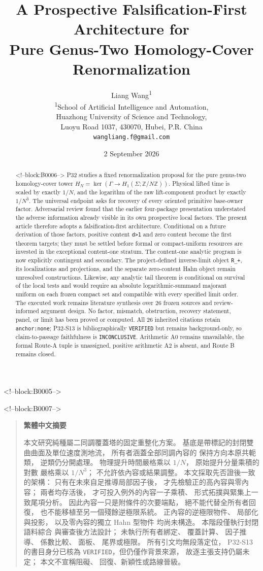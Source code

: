 \documentclass[11pt]{article}
\title{A Prospective Falsification-First Architecture for\\
Pure Genus-Two Homology-Cover Renormalization}
\author{Liang Wang\textsuperscript{1}\\
\small \textsuperscript{1}School of Artificial Intelligence and Automation,\\
\small Huazhong University of Science and Technology,\\
\small Luoyu Road 1037, 430070, Hubei, P.R. China\\
\small \texttt{wangliang.f@gmail.com}}
\date{2 September 2026}
\newenvironment{zhabstract}
  {\begin{quotation}\cjkfont\small\raggedright\noindent\textbf{繁體中文摘要}\par\smallskip\mdseries}
  {\end{quotation}}
\begin{document}
\maketitle

<!--block:B0005-->
\begin{abstract}

<!--block:B0006-->
P32 studies a fixed renormalization proposal for the pure genus-two
homology-cover tower
$H_N=\ker(\Gamma\to H_1(\Sigma;\mathbb Z/N\mathbb Z))$. Physical
lifted time is scaled by exactly $1/N$, and the logarithm of the
raw lift-component product by exactly $1/N^3$. The universal
endpoint asks for recovery of every oriented primitive base-owner
factor. Adversarial review found that the earlier four-package presentation
understated the adverse information already visible in its own
prospective local factors. The present article therefore adopts a
falsification-first architecture. Conditional on a future derivation of
those factors, positive content \texttt{d\textgreater{}1} and zero
content become the first theorem targets; they must be settled before
formal or compact-uniform resources are invested in the exceptional
content-one stratum. The content-one analytic program is now explicitly
contingent and secondary. The project-defined inverse-limit object
\texttt{R\_+}, its localizations and projections, and the separate
zero-content Hahn object remain unresolved constructions. Likewise, any
analytic tail theorem is conditional on survival of the local tests and
would require an absolute logarithmic-summand majorant uniform on each
frozen compact set and compatible with every specified limit order. The
executed work remains literature synthesis over 26 frozen sources and
review-informed argument design. No factor, mismatch, obstruction,
recovery statement, panel, or limit has been proved or computed. All 26
inherited citations retain \texttt{anchor:none}; P32-S13 is
bibliographically \texttt{VERIFIED} but remains background-only, so
claim-to-passage faithfulness is \texttt{INCONCLUSIVE}. Arithmetic A0 remains unavailable, the formal
Route-A tuple is unassigned, positive arithmetic A2 is absent, and Route
B remains closed.
\end{abstract}

<!--block:B0007-->
\begin{zhabstract}
本文研究純種屬二同調覆蓋塔的固定重整化方案。 基底是帶標記的封閉雙曲曲面及單位速度測地流， 所有者涵蓋全部同調內容的 保持方向本原共軛類， 逆類仍分開處理。 物理提升時間嚴格乘以 $1/N$， 原始提升分量乘積的對數 嚴格乘以 $1/N^3$； 不允許依內容或結果調整。 本文採取先否證後一致的架構： 只有在未來自足推導局部因子後， 才先檢驗正的高內容與零內容； 兩者均存活後， 才可投入例外的內容一子乘積、 形式拓撲與緊集上一致尾項分析。 因此內容一只是附條件的次要端點， 絕不能代替全所有者回復， 也不能移植至另一個殘餘逆極限系統。 正內容的逆極限物件、 局部化與投影， 以及零內容的獨立 Hahn 型物件 均尚未構造。 本階段僅執行封閉語料綜合 與審查後方法設計； 未執行所有者綁定、 覆蓋計算、 因子推導、 係數比較、 面板、 尾界或極限。 所有引文均無段落定位， P32-S13 的書目身分已核為 \texttt{VERIFIED}，但仍僅作背景來源， 故逐主張支持仍屬未定； 本文不宣稱阻礙、 回復、新穎性或路線晉級。
\end{zhabstract}
\end{document}
